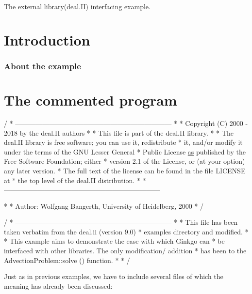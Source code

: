 The external library(deal.\+II) interfacing example.

 \label{_Intro}%
 \label{_Introduction}%
\section*{Introduction}

\label{_Abouttheexample}%
\subsubsection*{About the example }

\label{_CommProg}%
 \section*{The commented program}


\begin{DoxyCode}
/ * ---------------------------------------------------------------------
 *
 * Copyright (C) 2000 - 2018 by the deal.II authors
 *
 * This file is part of the deal.II library.
 *
 * The deal.II library is free software; you can use it, redistribute
 * it, and/or modify it under the terms of the GNU Lesser General
 * Public License \hyperlink{namespacegko_a73ce7e87aec389b5210630bb617b4baa}{as} published by the Free Software Foundation; either
 * version 2.1 of the License, or (at your option) any later version.
 * The full text of the license can be found in the file LICENSE at
 * the top level of the deal.II distribution.
 *
 * ---------------------------------------------------------------------

 *
 * Author: Wolfgang Bangerth, University of Heidelberg, 2000
 * /

/ * ---------------------------------------------------------------------
 *
 * This file has been taken verbatim from the deal.ii (version 9.0)
 * examples directory and modified.
 *
 * This example aims to demonstrate the ease with which Ginkgo can
 * be interfaced with other libraries. The only modification/ addition
 * has been to the AdvectionProblem::solve () function.
 *
 * /
\end{DoxyCode}


Just as in previous examples, we have to include several files of which the meaning has already been discussed\+:


